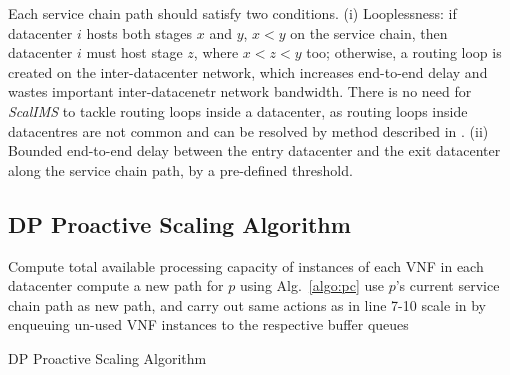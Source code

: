 Each service chain path should satisfy two conditions. (i) Looplessness: if datacenter $i$ hosts both stages $x$ and $y$, $x<y$ on the service chain, then datacenter $i$ must host stage $z$, where $x<z<y$ too; otherwise, a routing loop is created on the inter-datacenter network, which increases end-to-end delay and wastes important inter-datacenetr network bandwidth. There is no need for \textit{ScalIMS} to tackle routing loops inside a datacenter, as routing loops inside datacentres are not common and can be resolved by method described in \cite{stephens2012past}. (ii) Bounded end-to-end delay between the entry datacenter and the exit datacenter along the service chain path, by a pre-defined threshold. %

\subsection{DP Proactive Scaling Algorithm}
\label{sec:dp-proactive-scaling-alg}


\begin{algorithm}[!t]
{Compute total available processing capacity of instances of each VNF in each datacenter}\;
 {%
}
 {
 	{compute a new path for $p$ using Alg.~\ref{algo:pc}}\;
}
 {
 	{use $p$'s current service chain path as new path, and carry out same actions as in line 7-10 }\;
	}
{scale in by enqueuing un-used VNF instances to the respective buffer queues}\;
\caption{DP Proactive Scaling Algorithm}
\label{algo:dpalg}
\end{algorithm}

